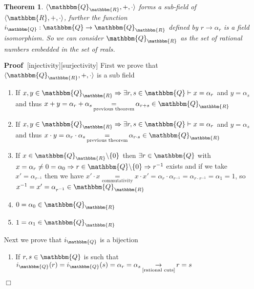 \documentclass{book}
\newcommand{\Rightarrowlim}{\mathop{\rightarrow}\limits}
\newcommand{\equallim}{\mathop{=}\limits}
\newcommand{\tmop}[1]{\ensuremath{\operatorname{#1}}}
\newcommand{\upl}{+}
\newenvironment{proof}{\noindent\textbf{Proof\ }}{\hspace*{\fill}$\Box$\medskip}
\newtheorem{theorem}{Theorem}
\begin{document}
{{\begin{theorem}
  \label{rationals in reals form a subfield}$\langle
  \mathbbm{Q}_{\mathbbm{R}}, \upl, \cdot \rangle$ forms a sub-field of
  $\langle \mathbbm{R}, \upl, \cdot \rangle$, further the function
  $i_{\mathbbm{Q}} : \mathbbm{Q} \rightarrow \mathbbm{Q}_{\mathbbm{R}}$
  defined by $r \rightarrow \alpha_r$ is a field isomorphism. So we can
  consider $\mathbbm{Q}_{\mathbbm{R}}$ as the set of rational numbers embedded
  in the set of reals.
\end{theorem}

\begin{proof}[injectivity][surjectivity]
  First we prove that $\langle \mathbbm{Q}_{\mathbbm{R}}, +, \cdot \rangle$ is
  a sub field
  \begin{enumerate}
    \item If $x, y \in \mathbbm{Q}_{\mathbbm{R}} \Rightarrow \exists r, s \in
    \mathbbm{Q} \vdash x = \alpha_r$ and $y = \alpha_s$ and thus $x \upl y =
    \alpha_r \upl \alpha_s \equallim_{\text{previous theorem}} \alpha_{r \upl
    s} \in \mathbbm{Q}_{\mathbbm{R}}$
    
    \item If $x, y \in \mathbbm{Q}_{\mathbbm{R}} \Rightarrow \exists r, s \in
    \mathbbm{Q} \vdash x = \alpha_r$ and $y = \alpha_s$ and thus $x \cdot y =
    \alpha_r \cdot \alpha_s \equallim_{\text{previous theorem}} \alpha_{r
    \cdot s} \in \mathbbm{Q}_{\mathbbm{R}}$
    
    \item If $x \in \mathbbm{Q}_{\mathbbm{R}} \backslash \{ 0 \}$ then
    $\exists r \in \mathbbm{Q}$ with $x = \alpha_r \neq 0 = \alpha_0
    \Rightarrow r \in \mathbbm{Q} \backslash \{ 0 \} \Rightarrow r^{- 1}$
    exists and if we take $x' = \alpha_{r^{- 1}}$ then we have $x' \cdot x
    \equallim_{\tmop{commutativity}} x \cdot x' = \alpha_r \cdot \alpha_{r^{-
    1}} = \alpha_{r \cdot r^{- 1}} = \alpha_1 = 1$, so $x^{- 1} = x' =
    \alpha_{r^{- 1}}^{} \in \mathbbm{Q}_{\mathbbm{R}}$
    
    \item $0 = \alpha_0 \in \mathbbm{Q}_{\mathbbm{R}}$
    
    \item $1 = \alpha_1 \in \mathbbm{Q}_{\mathbbm{R}}$
  \end{enumerate}
  Next we prove that $i_{\mathbbm{Q}}$ is a bijection
  \begin{enumerate}
    \item If $r, s \in \mathbbm{Q}$ is such that $i_{\mathbbm{Q}} (r) =
    i_{\mathbbm{Q}} (s) = \alpha_r = \alpha_s
    \Rightarrowlim_{\text{\ref{rational cuts}}} r = s$
    

\end{enumerate}
\end{proof}}}
\end{document}
